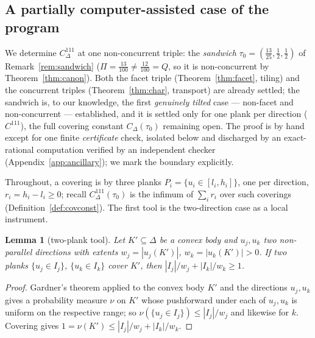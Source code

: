 \documentclass{aims}
\numberwithin{equation}{section}
\theoremstyle{plain}
\newtheorem{lemma}[theorem]{Lemma}
\theoremstyle{definition}
\theoremstyle{remark}
\begin{document}
\subsection*{A partially computer-assisted case of the program}
We determine $C^{111}_\Delta$ at one non-concurrent triple: the
\emph{sandwich} $\tau_0=(\tfrac{13}{25},\tfrac12,\tfrac12)$ of
Remark~\ref{rem:sandwich} ($\Pi=\tfrac{13}{100}\ne\tfrac{12}{100}=Q$, so it is
non-concurrent by Theorem~\ref{thm:canon}). Both the facet triple
(Theorem~\ref{thm:facet}, tiling) and the concurrent triples
(Theorem~\ref{thm:char}, transport) are already settled; the sandwich is, to
our knowledge, the first \emph{genuinely tilted} case --- non-facet and
non-concurrent --- established, and it is settled only for one plank per
direction ($C^{111}$), the full covering constant $C_\Delta(\tau_0)$ remaining
open. The proof is by hand except for one finite \emph{certificate} check,
isolated below and discharged by an exact-rational computation verified by an
independent checker (Appendix~\ref{app:ancillary}); we mark the boundary
explicitly.

Throughout, a covering is by three planks $P_i=\{u_i\in[l_i,h_i]\}$, one per
direction, $r_i=h_i-l_i\ge0$; recall $C^{111}_\Delta(\tau_0)$ is the infimum of
$\sum_i r_i$ over such coverings (Definition~\ref{def:covconst}). The first
tool is the two-direction case as a local instrument.

\begin{lemma}[two-plank tool]\label{lem:twoplank}
Let $K'\subseteq\Delta$ be a convex body and $u_j,u_k$ two non-parallel
directions with extents $w_j=|u_j(K')|$, $w_k=|u_k(K')|>0$. If two planks
$\{u_j\in I_j\}$, $\{u_k\in I_k\}$ cover $K'$, then
$|I_j|/w_j+|I_k|/w_k\ge1$.
\end{lemma}
\begin{proof}
Gardner's theorem \cite[Theorem~1]{Gardner88} applied to the convex body $K'$
and the directions $u_j,u_k$ gives a probability measure $\nu$ on $K'$ whose
pushforward under each of $u_j,u_k$ is uniform on the respective range; so
$\nu(\{u_j\in I_j\})\le|I_j|/w_j$ and likewise for $k$. Covering gives
$1=\nu(K')\le|I_j|/w_j+|I_k|/w_k$.
\end{proof}
\end{document}
